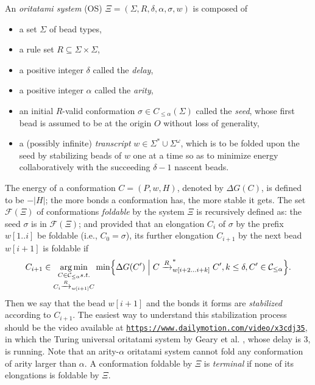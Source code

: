 \documentclass[runningheads]{llncs}
\DeclareMathOperator*{\argmin}{arg\,min}
\begin{document}
An \textit{oritatami system} (OS) $\Xi = (\Sigma, R, \delta, \alpha, \sigma, w)$ is composed of
\begin{itemize}
\item a set $\Sigma$ of bead types, 
\item a rule set $R \subseteq \Sigma \times \Sigma$, 
\item a positive integer $\delta$ called the \textit{delay}, 
\item a positive integer $\alpha$ called the \textit{arity}, %
\item an initial $R$-valid conformation $\sigma \in C_{\le \alpha}(\Sigma)$ called the \textit{seed}, whose first bead is assumed to be at the origin $O$ without loss of generality, 
\item a (possibly infinite) \textit{transcript} $w \in \Sigma^* \cup \Sigma^\omega$, which is to be folded upon the seed by stabilizing beads of $w$ one at a time so as to minimize energy collaboratively with the succeeding $\delta{-}1$ nascent beads. 
\end{itemize}
%
The energy of a conformation $C = (P, w, H)$, denoted by $\Delta G(C)$, is defined to be ${-}|H|$; the more bonds a conformation has, the more stable it gets. 
The set $\mathcal{F}(\Xi)$ of conformations \textit{foldable} by the system $\Xi$ is recursively defined as: the seed $\sigma$ is in $\mathcal{F}(\Xi)$; and provided that an elongation $C_i$ of $\sigma$ by the prefix $w[1..i]$ be foldable (i.e., $C_0 = \sigma$), its further elongation $C_{i+1}$ by the next bead $w[i+1]$ is foldable if 
\begin{equation}\label{eq:OS_CF}
C_{i+1} \in \argmin_{
\substack{
C \in \mathcal{C}_{\le \alpha} s.t. \\
C_i \xrightarrow{R}_{w[i+1]}C \\
}
}
\min \Bigl\{ \Delta G(C') \Bigm|
C \xrightarrow{R}^*_{w[i+2...i+k]}C', k\le \delta, C' \in \mathcal{C}_{\le \alpha}
\Bigr\}.
\end{equation}
%
Then we say that the bead $w[i+1]$ and the bonds it forms are \textit{stabilized} according to $C_{i+1}$. 
The easiest way to understand this stabilization process should be the video available at \href{https://www.dailymotion.com/video/x3cdj35}{\tt https://www.dailymotion.com/video/x3cdj35}, in which the Turing universal oritatami system by Geary et al. \cite{GeMeScSe2018}, whose delay is 3, is running. 
Note that an arity-$\alpha$ oritatami system cannot fold any conformation of arity larger than $\alpha$. %
A conformation foldable by $\Xi$ is \textit{terminal} if none of its elongations is foldable by $\Xi$. 
\end{document}
